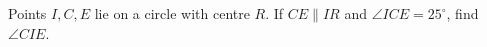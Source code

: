 Points $I,C,E$ lie on a circle with centre $R$. If $CE\parallel IR$ and $\angle ICE=25^\circ$, find $\angle CIE$.
